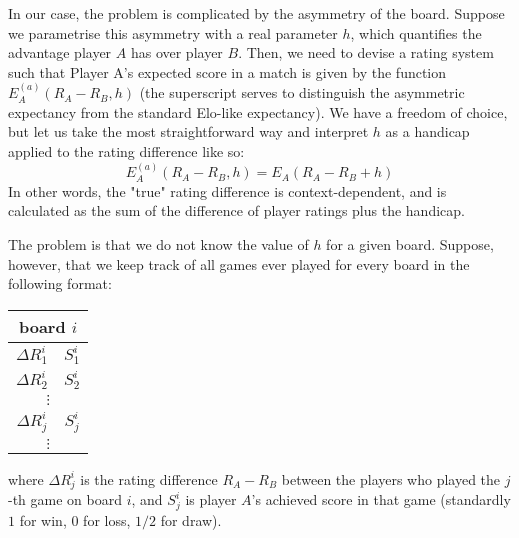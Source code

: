 \documentclass[12pt]{article}
\begin{document}
	In our case, the problem is complicated by the asymmetry of the board. Suppose we parametrise this asymmetry with a real parameter $h$, which quantifies the advantage player $A$ has over player $B$. Then, we need to devise a rating system such that Player A's expected score in a match is given by the function $E^{(a)}_A(R_A - R_B, h)$ (the superscript serves to distinguish the asymmetric expectancy from the standard Elo-like expectancy). We have a freedom of choice, but let us take the most straightforward way and interpret $h$ as a handicap applied to the rating difference like so:
	\begin{equation}\label{asymmetric_expectancy}
	E^{(a)}_A(R_A - R_B, h) = E_A(R_A - R_B + h)
	\end{equation}
	In other words, the "true" rating difference is context-dependent, and is calculated as the sum of the difference of player ratings plus the handicap.
	
	The problem is that we do not know the value of $h$ for a given board. Suppose, however, that we keep track of all games ever played for every board in the following format:
	\begin{center} \label{game_table}
	\begin{tabular}{ c | c }
	\multicolumn{2}{c}{board $i$} \\
	\hline
 	$\Delta R^i_1$ & $S^i_1$ \\ 
 	$\Delta R^i_2$ & $S^i_2$ \\ 
 	\multicolumn{2}{c}{$\vdots$} \\ 
 	$\Delta R^i_j$ & $S^i_j$    \\
 	\multicolumn{2}{c}{$\vdots$}
	\end{tabular}
	\end{center}
	where $\Delta R^i_j$ is the rating difference $R_A - R_B$ between the players who played the $j$-th game on board $i$, and $S^i_j$ is player $A$'s achieved score in that game (standardly $1$ for win, $0$ for loss, $1/2$ for draw).
	
\end{document}
